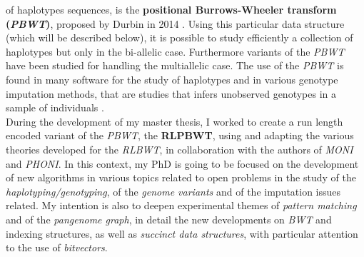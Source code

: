 \documentclass[a4paper,11pt, oneside]{article}
\begin{document}
of haplotypes sequences, is the \textbf{positional Burrows-Wheeler transform
  (\textit{PBWT})}, proposed by Durbin in 2014 \cite{pbwt_durbin}. Using this
particular data structure (which will be described below), it is possible to
study efficiently a collection of haplotypes but only in the bi-allelic
case. Furthermore variants of the \textit{PBWT} have been studied for
handling the multiallelic case. The use of the \textit{PBWT} is found in many
software for the study of haplotypes and in various genotype imputation methods,
that are studies that infers unobserved genotypes in a sample of individuals
\cite{impute5}.\\
During the development of my master thesis, I worked to create a run length
encoded variant of the \textit{PBWT}, the \textbf{RLPBWT}, using and adapting
the various theories developed for the \textit{RLBWT}, in collaboration with the
authors of \textit{MONI} and \textit{PHONI}. In this context, my PhD
is going to be focused on the development of new algorithms in
various topics related to open problems in the study of the
\textit{haplotyping/genotyping}, of the \textit{genome 
  variants} and of the imputation issues related. My intention is also to deepen
experimental themes  
of \textit{pattern matching} and of the \textit{pangenome graph}, in detail the
new developments on \textit{BWT} and indexing structures, as well as
\textit{succinct data structures}, with particular attention to the use of
\textit{bitvectors}.
\end{document}
